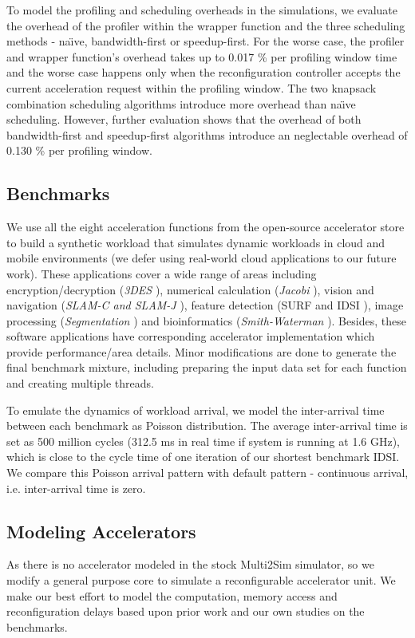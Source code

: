 To model the profiling and scheduling overheads in the simulations,
we evaluate the overhead of the profiler within the wrapper function and the
three scheduling methods - na\"{\i}ve, bandwidth-first or speedup-first. For
the worse case, the profiler and wrapper function's overhead takes up
to 0.017 \% per profiling window time and the worse case happens only
when the reconfiguration controller accepts the current acceleration
request within the profiling window. The two knapsack combination
scheduling algorithms introduce more overhead than na\"{\i}ve scheduling. However, further evaluation shows that the overhead of both bandwidth-first and speedup-first algorithms introduce an neglectable overhead of 0.130 \% per profiling window. 

\subsection{Benchmarks}
We use all the eight acceleration functions from the
open-source accelerator store \cite{accstore} to build a synthetic
workload that simulates dynamic workloads in cloud and mobile
environments (we defer using real-world cloud applications to our
future work).  These applications cover a wide range of areas
including encryption/decryption ({\em 3DES} \cite{openssl}), numerical
calculation ({\em Jacobi} \cite{jacobi-wiki}), vision and navigation
({\em SLAM-C and SLAM-J} \cite{openslam}), feature detection (SURF and
IDSI \cite{opencv}), image processing ({\em Segmentation}
\cite{segmentation-wiki}) and bioinformatics ({\em Smith-Waterman}
\cite{smithwaterman-wiki}). Besides, these software applications have
corresponding accelerator implementation which provide
performance/area details. Minor modifications are done to generate the
final benchmark mixture, including preparing the input data set for
each function and creating multiple threads.

To emulate the dynamics of workload arrival, we model the inter-arrival time between
each benchmark as Poisson distribution. The average
inter-arrival time is set as 500 million cycles (312.5 ms
in real time if system is running at 1.6 GHz), which is close to the
cycle time of one iteration of our shortest benchmark IDSI. We compare
this Poisson arrival pattern with default pattern - continuous
arrival, i.e. inter-arrival time is zero.

\subsection{Modeling Accelerators}
As there is no accelerator modeled in the stock Multi2Sim simulator,
so we modify a general purpose core to simulate a reconfigurable
accelerator unit. We make our best effort to model the
computation, memory access and reconfiguration delays  based
upon prior work and our own studies on the benchmarks. 

